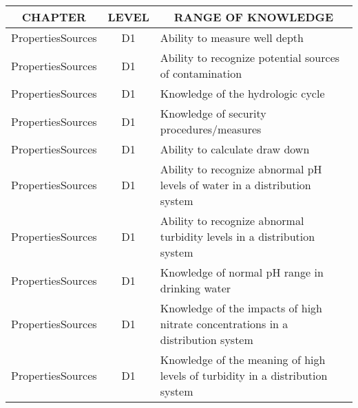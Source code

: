 \documentclass{article}
\begin{document}
\begin{table}[]
\begin{tabular}{|l|c|l|}
\hline
\multicolumn{1}{|c|}{\textbf{CHAPTER}} & \textbf{LEVEL} & \multicolumn{1}{c|}{\textbf{RANGE OF   KNOWLEDGE}}                                                                                \\ \hline
PropertiesSources                      & D1             & Ability to measure   well depth                                                                                                   \\ \hline
PropertiesSources                      & D1             & Ability to recognize   potential sources of contamination                                                                         \\ \hline
PropertiesSources                      & D1             & Knowledge of the   hydrologic cycle                                                                                               \\ \hline
PropertiesSources                      & D1             & Knowledge of security   procedures/measures                                                                                       \\ \hline
PropertiesSources                      & D1             & Ability to calculate   draw down                                                                                                  \\ \hline
PropertiesSources                      & D1             & Ability to recognize   abnormal pH levels of water in a distribution system                                                       \\ \hline
PropertiesSources                      & D1             & Ability to recognize   abnormal turbidity levels in a distribution system                                                         \\ \hline
PropertiesSources                      & D1             & Knowledge of normal   pH range in drinking water                                                                                  \\ \hline
PropertiesSources                      & D1             & Knowledge of the   impacts of high nitrate concentrations in a distribution system                                                \\ \hline
PropertiesSources                      & D1             & Knowledge of the   meaning of high levels of turbidity in a distribution system                                                   \\ \hline

\end{tabular}
\end{table}
\end{document}
